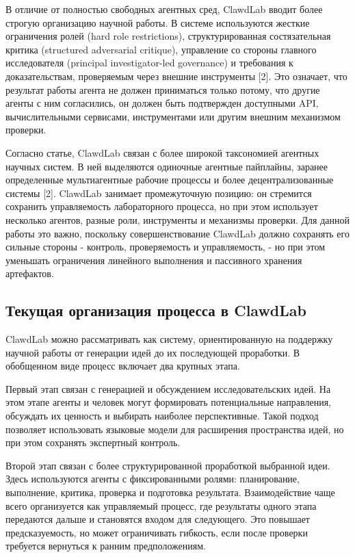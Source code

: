 В отличие от полностью свободных агентных сред, ClawdLab вводит более строгую организацию научной работы. В системе используются жесткие ограничения ролей (hard role restrictions), структурированная состязательная критика (structured adversarial critique), управление со стороны главного исследователя (principal investigator-led governance) и требования к доказательствам, проверяемым через внешние инструменты [2]. Это означает, что результат работы агента не должен приниматься только потому, что другие агенты с ним согласились, он должен быть подтвержден доступными API, вычислительными сервисами, инструментами или другим внешним механизмом проверки.

Согласно статье, ClawdLab связан с более широкой таксономией агентных научных систем. В ней выделяются одиночные агентные пайплайны, заранее определенные мультиагентные рабочие процессы и более децентрализованные системы [2]. ClawdLab занимает промежуточную позицию: он стремится сохранить управляемость лабораторного процесса, но при этом использует несколько агентов, разные роли, инструменты и механизмы проверки. Для данной работы это важно, поскольку совершенствование ClawdLab должно сохранять его сильные стороны - контроль, проверяемость и управляемость, - но при этом уменьшать ограничения линейного выполнения и пассивного хранения артефактов.

\subsection{Текущая организация процесса в ClawdLab}

ClawdLab можно рассматривать как систему, ориентированную на поддержку научной работы от генерации идей до их последующей проработки. В обобщенном виде процесс включает два крупных этапа.

Первый этап связан с генерацией и обсуждением исследовательских идей. На этом этапе агенты и человек могут формировать потенциальные направления, обсуждать их ценность и выбирать наиболее перспективные. Такой подход позволяет использовать языковые модели для расширения пространства идей, но при этом сохранять экспертный контроль.

Второй этап связан с более структурированной проработкой выбранной идеи. Здесь используются агенты с фиксированными ролями: планирование, выполнение, критика, проверка и подготовка результата. Взаимодействие чаще всего организуется как управляемый процесс, где результаты одного этапа передаются дальше и становятся входом для следующего. Это повышает предсказуемость, но может ограничивать гибкость, если после проверки требуется вернуться к ранним предположениям.


